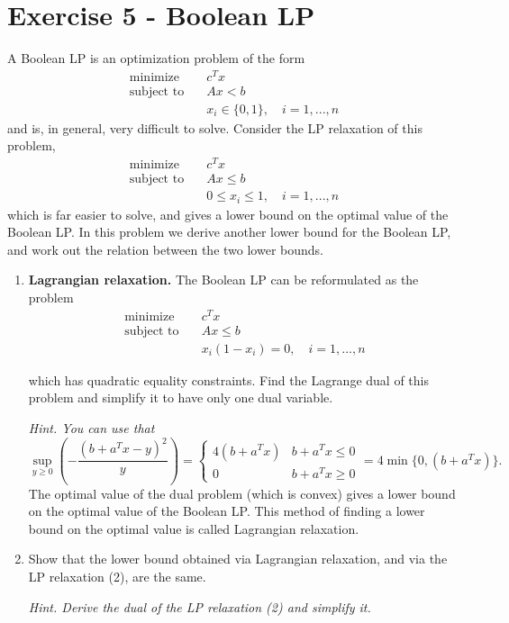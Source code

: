 \documentclass[11pt,a4paper]{article}
\begin{document}
\newpage
\section{Exercise 5 - Boolean LP}
A Boolean LP is an optimization problem of the form
\begin{equation}
    \begin{aligned}
        \text{minimize} \quad & c^{T}x \\
        \text{subject to} \quad & Ax < b \\
        & x_{i} \in \{0,1\}, \quad i=1,...,n
    \end{aligned}
\end{equation}
and is, in general, very difficult to solve. Consider the LP relaxation of this problem,
\begin{equation} \label{eq:2} \tag{2}
    \begin{aligned}
        \text{minimize} \quad & c^{T}x \\
        \text{subject to} \quad & Ax \le b \\
        & 0 \le x_{i} \le 1, \quad i=1,...,n
    \end{aligned}
\end{equation}
which is far easier to solve, and gives a lower bound on the optimal value of the Boolean LP. In this problem we derive another lower bound for the Boolean LP, and work out the relation between the two lower bounds.
\begin{enumerate}
    \item \textbf{Lagrangian relaxation.} The Boolean LP can be reformulated as the problem
    \begin{equation}
        \begin{aligned}
            \text{minimize} \quad & c^{T}x \\
            \text{subject to} \quad & Ax \le b \\
            & x_{i}(1-x_{i}) = 0, \quad i=1,...,n
        \end{aligned}
    \end{equation}
    
    which has quadratic equality constraints. Find the Lagrange dual of this problem and simplify it to have only one dual variable.
    
    \textit{Hint. You can use that}
    $$ \sup_{y \ge 0} \left( -\frac{(b+a^{T}x-y)^{2}}{y} \right) = \begin{cases} 4(b+a^{T}x) & b+a^{T}x \le 0 \\ 0 & b+a^{T}x \ge 0 \end{cases} = 4 \min\{0, (b+a^{T}x)\} . $$
    The optimal value of the dual problem (which is convex) gives a lower bound on the optimal value of the Boolean LP. This method of finding a lower bound on the optimal value is called Lagrangian relaxation.
    
    \item Show that the lower bound obtained via Lagrangian relaxation, and via the LP relaxation (2), are the same. 
    
    \textit{Hint. Derive the dual of the LP relaxation (2) and simplify it.}
\end{enumerate}
\end{document}
